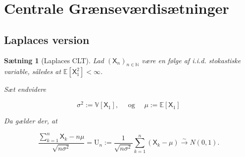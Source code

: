 \documentclass{article}
\newcommand{\1}{\mathbbm{1}}
\newcommand{\X}{\mathsf{X}}
\theoremstyle{boxed}
\newtheorem{proposition}[theorem]{Sætning}
\begin{document}
\section{Centrale Grænseværdisætninger}
\subsection{Laplaces version}
\begin{theorem-box}
    \begin{proposition}[Laplaces CLT]
        Lad $\left(\X_n\right)_{n \in \mathbb{N}}$ være en følge af i.i.d. stokastiske variable, således at $\mathbb{E}\left[\X_1^2\right]<\infty$.

Sæt endvidere

$$
\sigma^2:=\mathbb{V}\left[\X_1\right], \quad \text { og } \quad \mu:=\mathbb{E}\left[\X_1\right]
$$


Da gælder der, at

$$
\frac{\sum_{k=1}^n \X_k-n \mu}{\sqrt{n \sigma^2}}=\mathrm{U}_n:=\frac{1}{\sqrt{n \sigma^2}} \sum_{k=1}^n\left(\X_k-\mu\right) \stackrel{\sim}{\rightarrow} N(0,1) .
$$

    \end{proposition}
\end{theorem-box}
\end{document}

